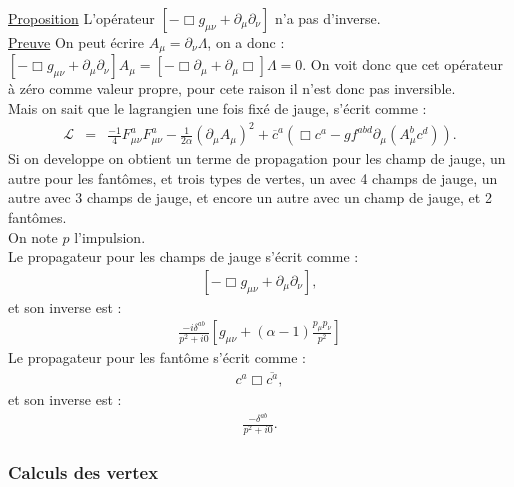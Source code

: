\documentclass[a4paper,11pt]{article}
\theoremstyle{plain}
\theoremstyle{definition}
\theoremstyle{remark}
\numberwithin{equation}{section}
\numberwithin{equation}{subsection}
\numberwithin{figure}{section}
\begin{document}
\noindent
\underline{Proposition}
L'opérateur $\left[   - \Box g_{\mu \nu} +  \partial_{\mu} \partial_{\nu}  \right]$  n'a pas d'inverse.\\

\noindent
\underline{Preuve}
On peut écrire $A_{\mu} = \partial_{\nu} \Lambda$, on a donc :
$\left[   - \Box g_{\mu \nu} +  \partial_{\mu} \partial_{\nu}  \right] A_{\mu} = \left[   - \Box \partial_{\mu} 
+  \partial_{\mu} \Box  \right]  \Lambda = 0$. On voit donc que cet opérateur à zéro comme valeur propre, pour cete raison 
il n'est donc pas inversible.\\

\noindent
Mais on sait que le lagrangien une fois fixé de jauge, s'écrit comme :
\begin{eqnarray}
\mathcal{L}   &=&   \frac{-1}{4} F_{\mu\nu}^{a} F_{\mu \nu}^{a} -\frac{1}{2\alpha} \left(\partial_{\mu}A_{\mu} \right)^{2} 
+ \overline{c}^{a} \left( \Box c^{a} -g f^{abd} \partial_{\mu} \left( A^{b}_{\mu} c^{d} \right) \right) .
\end{eqnarray}
Si on developpe on obtient un terme de propagation pour les champ de jauge, un autre pour les fantômes, et trois types de vertes, 
un avec 4 champs de jauge, un autre avec 3 champs de jauge, et encore un autre avec un champ de jauge, et 2 fantômes.\\ 
On note $p$ l'impulsion.\\
Le propagateur pour les champs de jauge s'écrit comme :
\begin{eqnarray}
 \left[   - \Box g_{\mu \nu} +  \partial_{\mu} \partial_{\nu}  \right],
\end{eqnarray}
et son inverse est : 
\begin{eqnarray}
 \frac{-i \delta^{ab}}{p^2 + i0} \left[ g_{\mu \nu} + (\alpha - 1)\frac{p_{\mu} p_{\nu}}{p^2}  \right]
\end{eqnarray}
Le propagateur pour les fantôme s'écrit comme :
\begin{eqnarray}
 c^{a}  \Box \overline{c^{a}} ,
\end{eqnarray}
et son inverse est : 
\begin{eqnarray}
 \frac{-\delta^{ab}}{p^2+i0} .
\end{eqnarray}

\subsubsection{Calculs des  vertex}
\end{document}
